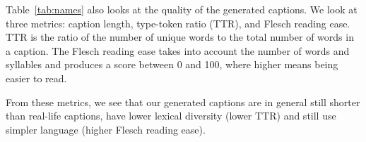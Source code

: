 Table~\ref{tab:names} also looks at the quality of the generated captions. We
look at three metrics: caption length, type-token ratio (TTR), and Flesch
reading ease. TTR is the ratio of the number of unique words to the total
number of words in a caption. The Flesch reading ease takes into account the
number of words and syllables and produces a score between 0 and 100, where
higher means being easier to read.

From these metrics, we see that our generated captions are in general still
shorter than real-life captions, have lower lexical diversity (lower TTR)
and still use simpler language (higher Flesch reading ease).
